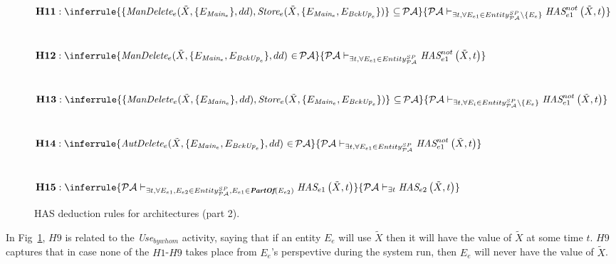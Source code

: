 \documentclass[a4paper]{article}
\begin{document}
\begin{figure}[htbp]
{\begin{minipage}{11.87 cm}
\begin{tabbing}
$\mathbf{H11}: \inferrule{\{\textit{ManDelete}_{e}(\tilde{X}, \{E_{\textit{Main}_e}\}, dd), \textit{Store}_{e}(\tilde{X}, \{E_{\textit{Main}_e}, E_{\textit{BckUp}_e}\})\}\ {\subseteq} \, \mathcal{P}\mathcal{A}}{\mathcal{P}\mathcal{A} \vdash_{\exists t,\forall E_{e1} \in Entity^{SP}_{\mathcal{P}\mathcal{A}} \backslash \{E_{e}\}} \textit{HAS}^{not}_{e1}\left(\tilde{X}, t \right)}$\\\\\\
$\mathbf{H12}: \inferrule{\textit{ManDelete}_{e}(\tilde{X}, \{E_{\textit{Main}_e}, E_{\textit{BckUp}_e}\}, dd)\ {\in} \, \mathcal{P}\mathcal{A}}{\mathcal{P}\mathcal{A} \vdash_{\exists t,\forall E_{e1} \in Entity^{SP}_{\mathcal{P}\mathcal{A}}} \textit{HAS}^{not}_{e1}\left(\tilde{X}, t \right)}$\\\\\\
$\mathbf{H13}: \inferrule{\{\textit{ManDelete}_{e}(\tilde{X}, \{E_{\textit{Main}_e}\}, dd), \textit{Store}_{e}(\tilde{X}, \{E_{\textit{Main}_e}, E_{\textit{BckUp}_e}\})\}\ {\subseteq} \, \mathcal{P}\mathcal{A}}{\mathcal{P}\mathcal{A} \vdash_{\exists t, \forall E_i \in Entity^{SP}_{\mathcal{P}\mathcal{A}} \backslash \{E_{e}\}} \textit{HAS}^{not}_{e1}\left(\tilde{X}, t \right)}$\\\\\\
$\mathbf{H14}: \inferrule{\textit{AutDelete}_{e}(\tilde{X}, \{E_{\textit{Main}_e}, E_{\textit{BckUp}_e}\}, dd)\ {\in} \, \mathcal{P}\mathcal{A}}{\mathcal{P}\mathcal{A} \vdash_{\exists t,\forall E_{e1} \in Entity^{SP}_{\mathcal{P}\mathcal{A}}} \textit{HAS}^{not}_{e1}\left(\tilde{X}, t \right)}$\\\\\\
$\mathbf{H15}: \inferrule{\mathcal{P}\mathcal{A} \vdash_{\exists t, \forall E_{e1},  E_{e2} \in Entity^{SP}_{\mathcal{P}\mathcal{A}}, E_{e1} \in \textit{\textbf{PartOf}}(E_{e2})} \textit{HAS}_{e1} \left(\tilde{X}, t \right)}{\mathcal{P}\mathcal{A} \vdash_{\exists t} \textit{HAS}_{e2} \left(\tilde{X}, t \right)}$\\
\end{tabbing}
\end{minipage}
}
\caption{HAS deduction rules for architectures (part 2).}
\label{tab:eq:axioms1}
\end{figure}

In Fig~\ref{tab:eq:axioms1}, $H9$ is related to the \textit{Use}$_{bywhom}$ activity, saying that if an entity $E_e$ will use $\tilde{X}$ then it will have the value of $\tilde{X}$ at some time $t$. $H9$ captures that in case none of the $H1$-$H9$ takes place from $E_e$'s perspevtive during the system run, then $E_e$ will never have the value of $\tilde{X}$. 
    
\end{document}
